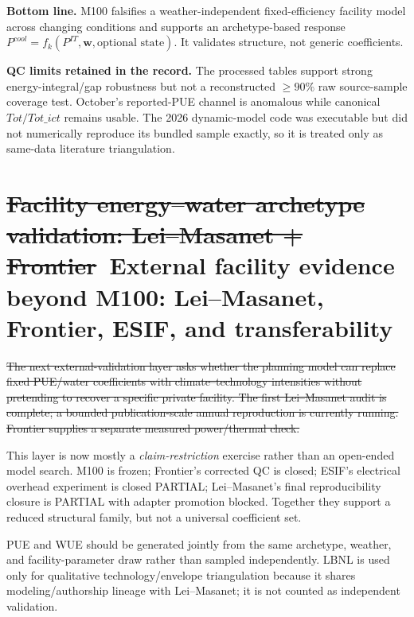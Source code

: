 \documentclass[11pt]{article}
\newcommand{\oldtxt}[1]{\textcolor{blue!70!black}{\sout{#1}}}
\newcommand{\newtxt}[1]{\textcolor{green!45!black}{#1}}
\newcommand{\latesttxt}[1]{\textcolor{purple!85!black}{#1}}
\begin{document}
\newtxt{\textbf{Bottom line.} M100 falsifies a weather-independent fixed-efficiency facility model across changing conditions and supports an archetype-based response \(P^{cool}=f_k(P^{IT},\mathbf w,\text{optional state})\). It validates structure, not generic coefficients.}

\newtxt{\textbf{QC limits retained in the record.} The processed tables support strong energy-integral/gap robustness but not a reconstructed \(\ge90\%\) raw source-sample coverage test. October's reported-PUE channel is anomalous while canonical \(Tot/Tot\_ict\) remains usable. The 2026 dynamic-model code was executable but did not numerically reproduce its bundled sample exactly, so it is treated only as same-data literature triangulation.}

\section[External facility evidence beyond M100]{\oldtxt{Facility energy--water archetype validation: Lei--Masanet + Frontier}\ \latesttxt{External facility evidence beyond M100: Lei--Masanet, Frontier, ESIF, and transferability}}

\oldtxt{The next external-validation layer asks whether the planning model can replace fixed PUE/water coefficients with climate--technology intensities without pretending to recover a specific private facility. The first Lei--Masanet audit is complete; a bounded publication-scale annual reproduction is currently running. Frontier supplies a separate measured power/thermal check.}

\latesttxt{This layer is now mostly a \emph{claim-restriction} exercise rather than an open-ended model search. M100 is frozen; Frontier's corrected QC is closed; ESIF's electrical overhead experiment is closed PARTIAL; Lei--Masanet's final reproducibility closure is PARTIAL with adapter promotion blocked. Together they support a reduced structural family, but not a universal coefficient set.}

\newtxt{PUE and WUE should be generated jointly from the same archetype, weather, and facility-parameter draw rather than sampled independently. LBNL is used only for qualitative technology/envelope triangulation because it shares modeling/authorship lineage with Lei--Masanet; it is not counted as independent validation.}
\end{document}
